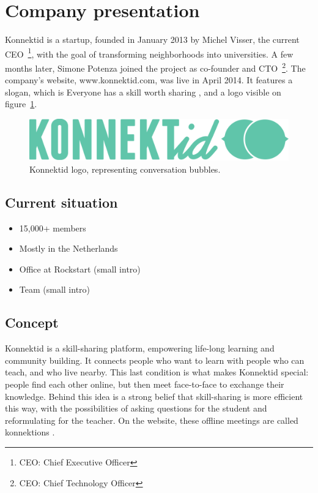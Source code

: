 \section{Company presentation}
\label{sec:company}

Konnektid is a startup, founded in January 2013 by Michel {\sc Visser}, the current CEO~\footnote{CEO: Chief Executive Officer},
with the goal of transforming neighborhoods into universities. A few months later, Simone {\sc Potenza} joined the project
as co-founder and CTO~\footnote{CEO: Chief Technology Officer}. The company's website, www.konnektid.com, was live in April 2014. It features a slogan, which is \guillemotleft{} Everyone has a skill worth sharing \guillemotright{},
and a logo visible on {\sc figure}~\ref{fig:logo}.
\vspace{1cm}

\begin{figure}[h]
    \centering
    \includegraphics[scale=0.6]{figure/logo_konnektid.png}
    \caption{Konnektid logo, representing conversation bubbles.}
    \label{fig:logo}
\end{figure}

\subsection{Current situation}
\label{ssec:situation}

\begin{itemize}
    \item 15,000+ members
    \item Mostly in the Netherlands
    \item Office at Rockstart (small intro)
    \item Team (small intro)
\end{itemize}

\subsection{Concept}
\label{ssec:concept}

Konnektid is a skill-sharing platform, empowering life-long learning and community building. It connects people who want to learn with people who can teach, and who live nearby.
This last condition is what makes Konnektid special: people find each other online, but then meet face-to-face to exchange their knowledge.
Behind this idea is a strong belief that skill-sharing is more efficient this way, with the possibilities of asking questions for the student and reformulating for the teacher.
On the website, these offline meetings are called \guillemotleft{} konnektions \guillemotright{}.

